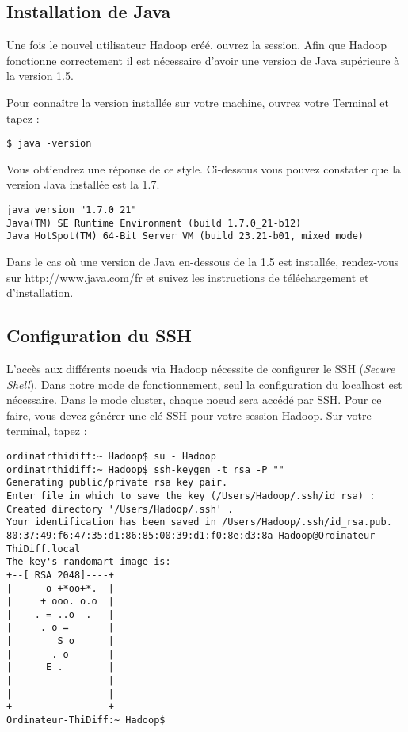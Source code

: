 \subsection{Installation de Java}

\par Une fois le nouvel utilisateur Hadoop créé, ouvrez la session. Afin que Hadoop fonctionne correctement il est nécessaire d'avoir une version de Java supérieure à la version 1.5. 

\par Pour connaître la version installée sur votre machine, ouvrez votre Terminal et tapez :

\begin{verbatim}
$ java -version
\end{verbatim}

\par Vous obtiendrez une réponse de ce style. Ci-dessous vous pouvez constater que la version Java installée est la 1.7.

\begin{verbatim}
java version "1.7.0_21"
Java(TM) SE Runtime Environment (build 1.7.0_21-b12)
Java HotSpot(TM) 64-Bit Server VM (build 23.21-b01, mixed mode)
\end{verbatim}

\par Dans le cas où une version de Java en-dessous de la 1.5 est installée, rendez-vous sur http://www.java.com/fr et suivez les instructions de téléchargement et d'installation.

\subsection{Configuration du SSH}

\par L'accès aux différents noeuds via Hadoop nécessite de configurer le SSH (\textit{Secure Shell}). Dans notre mode de fonctionnement, seul la configuration du localhost est nécessaire. Dans le mode cluster, chaque noeud sera accédé par SSH. Pour ce faire, vous devez générer une clé SSH pour votre session Hadoop. Sur votre terminal, tapez :

\begin{verbatim}
ordinatrthidiff:~ Hadoop$ su - Hadoop
ordinatrthidiff:~ Hadoop$ ssh-keygen -t rsa -P ""
Generating public/private rsa key pair.
Enter file in which to save the key (/Users/Hadoop/.ssh/id_rsa) :
Created directory '/Users/Hadoop/.ssh' .
Your identification has been saved in /Users/Hadoop/.ssh/id_rsa.pub.
80:37:49:f6:47:35:d1:86:85:00:39:d1:f0:8e:d3:8a Hadoop@Ordinateur-ThiDiff.local
The key's randomart image is:
+--[ RSA 2048]----+
|      o +*oo+*.  |
|     + ooo. o.o  |
|    . = ..o  .   |
|     . o =       |
|        S o      |
|       . o       |
|      E .        |
|                 |
|                 |
+-----------------+
Ordinateur-ThiDiff:~ Hadoop$
\end{verbatim}

